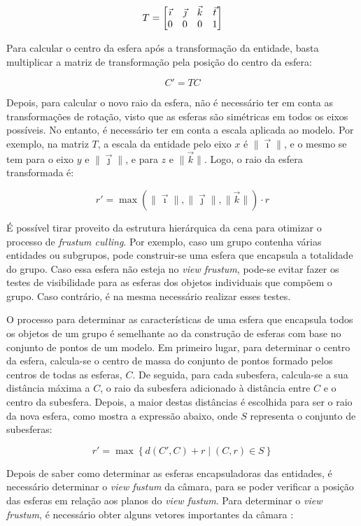 \documentclass[12pt, a4paper]{article}
\begin{document}
$$
\bgroup
    T =
    \begin{bmatrix}
        \vec \imath & \vec \jmath & \vec k & \vec t \\
        0 & 0 & 0 & 1
    \end{bmatrix}
\egroup
$$

Para calcular o centro da esfera após a transformação da entidade, basta multiplicar a matriz de
transformação pela posição do centro da esfera:

$$
C' = T C
$$

Depois, para calcular o novo raio da esfera, não é necessário ter em conta as transformações de
rotação, visto que as esferas são simétricas em todos os eixos possíveis. No entanto, é necessário
ter em conta a escala aplicada ao modelo. Por exemplo, na matriz $T$, a escala da entidade pelo
eixo $x$ é $\lVert \vec \imath \rVert$, e o mesmo se tem para o eixo $y$ e
$\lVert \vec \jmath \rVert$, e para $z$ e $\lVert \vec k \rVert$. Logo, o raio da esfera
transformada é:

$$
r' =
    \max
        \left ( \lVert \vec \imath \rVert, \lVert \vec \jmath \rVert, \lVert \vec k \rVert \right )
    \cdot
        r
$$

É possível tirar proveito da estrutura hierárquica da cena para otimizar o processo de
\emph{frustum culling}. Por exemplo, caso um grupo contenha várias entidades ou subgrupos, pode
construir-se uma esfera que encapsula a totalidade do grupo. Caso essa esfera não esteja no
\emph{view frustum}, pode-se evitar fazer os testes de visibilidade para as esferas dos objetos
individuais que compõem o grupo. Caso contrário, é na mesma necessário realizar esses testes.

O processo para determinar as características de uma esfera que encapsula todos os objetos de um
grupo é semelhante ao da construção de esferas com base no conjunto de pontos de um modelo. Em
primeiro lugar, para determinar o centro da esfera, calcula-se o centro de massa do conjunto de
pontos formado pelos centros de todas as esferas, $C$. De seguida, para cada subesfera, calcula-se
a sua distância máxima a $C$, o raio da subesfera adicionado à distância entre $C$ e o centro da
subesfera. Depois, a maior destas distâncias é escolhida para ser o raio da nova esfera, como mostra
a expressão abaixo, onde $S$ representa o conjunto de subesferas:

$$
r' = \max \left \lbrace d(C', C) + r \mid (C, r) \in S \right \rbrace
$$

Depois de saber como determinar as esferas encapsuladoras das entidades, é necessário determinar
o \emph{view fustum} da câmara, para se poder verificar a posição das esferas em relação aos planos
do \emph{view fustum}. Para determinar o \emph{view frustum}, é necessário obter alguns vetores
importantes da câmara \cite{lighthouse3d-frustum-planes}:
\end{document}
